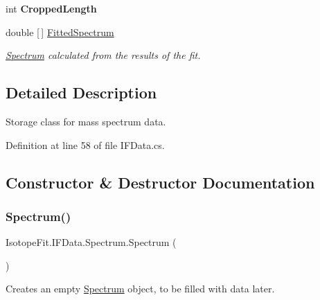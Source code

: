 \begin{DoxyCompactItemize}
int {\bfseries Cropped\+Length}
\item 
double \mbox{[}$\,$\mbox{]} \mbox{\hyperlink{class_isotope_fit_1_1_i_f_data_1_1_spectrum_aaac6472ac824b7675d2811f200102270}{Fitted\+Spectrum}}
\begin{DoxyCompactList}\small\item\em \mbox{\hyperlink{class_isotope_fit_1_1_i_f_data_1_1_spectrum}{Spectrum}} calculated from the results of the fit. \end{DoxyCompactList}\end{DoxyCompactItemize}


\subsection{Detailed Description}
Storage class for mass spectrum data. 



Definition at line 58 of file I\+F\+Data.\+cs.



\subsection{Constructor \& Destructor Documentation}
\mbox{\label{class_isotope_fit_1_1_i_f_data_1_1_spectrum_a57f4b9355944433a34eb668f22bb1f17}} 
\subsubsection{\texorpdfstring{Spectrum()}{Spectrum()}\hspace{0.1cm}{\footnotesize\ttfamily [1/2]}}
{\footnotesize\ttfamily Isotope\+Fit.\+I\+F\+Data.\+Spectrum.\+Spectrum (\begin{DoxyParamCaption}{ }\end{DoxyParamCaption})}



Creates an empty \mbox{\hyperlink{class_isotope_fit_1_1_i_f_data_1_1_spectrum}{Spectrum}} object, to be filled with data later. 



